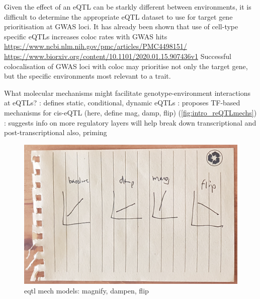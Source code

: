 \begin{outline}
\1 Given the effect of an eQTL can be starkly different between environments, it is difficult to determine the appropriate \gls{eQTL} dataset to use for target gene prioritisation at GWAS loci.
\2 It has already been shown that use of cell-type specific eQTLs increases coloc rates with GWAS hits \autocite{kim-hellmuth2019CellTypeSpecific} \url{https://www.ncbi.nlm.nih.gov/pmc/articles/PMC4498151/} \url{https://www.biorxiv.org/content/10.1101/2020.01.15.907436v1}
    \2 Successful colocalisation of GWAS loci with coloc may prioritise not only the target gene, but the specific environments most relevant to a trait.

\1 What molecular mechanisms might facilitate genotype-environment interactions at \glspl{eQTL}?
    \2 \autocite{ackermann2013ImpactNaturalGenetic}: defines static, conditional, dynamic eQTLs
    \2 \textcite{fu2012UnravelingRegulatoryMechanisms}: proposes TF-based mechanisms for cis-eQTL (here, define mag, damp, flip) (\autoref{fig:intro_reQTLmechs})
    \2 \textcite{gaffney2013GlobalPropertiesFunctional,rotival2019CharacterisingGeneticBasis}: suggests info on more regulatory layers will help break down transcriptional and post-transcriptional
        \3 also, priming

\begin{figure}
    \centering
    \includegraphics[width=1.0\textwidth,page=1]{mainmatter/figures/chapter_01/fig_mockup_reQTLs_Screenshot 2020-05-21 at 17.08.49.png}
    \caption{eqtl mech models: magnify, dampen, flip}
    \label{fig:intro_reQTLmechs}
\end{figure}


\end{outline}
